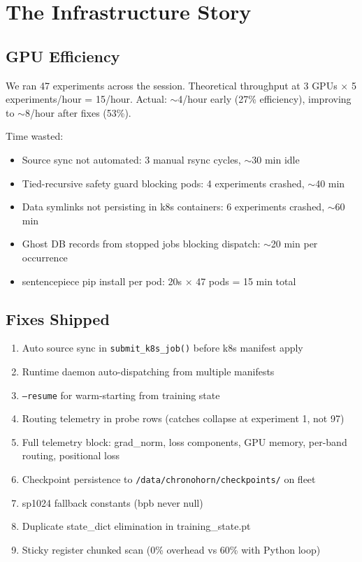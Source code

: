 \documentclass[11pt,a4paper]{report}
\begin{document}
\chapter{The Infrastructure Story}

\section{GPU Efficiency}

We ran 47 experiments across the session. Theoretical throughput at 3 GPUs $\times$ 5 experiments/hour = 15/hour. Actual: $\sim$4/hour early (27\% efficiency), improving to $\sim$8/hour after fixes (53\%).

Time wasted:
\begin{itemize}[nosep]
\item Source sync not automated: 3 manual rsync cycles, $\sim$30 min idle
\item Tied-recursive safety guard blocking pods: 4 experiments crashed, $\sim$40 min
\item Data symlinks not persisting in k8s containers: 6 experiments crashed, $\sim$60 min
\item Ghost DB records from stopped jobs blocking dispatch: $\sim$20 min per occurrence
\item sentencepiece pip install per pod: 20s $\times$ 47 pods = 15 min total
\end{itemize}

\section{Fixes Shipped}

\begin{enumerate}[nosep]
\item Auto source sync in \texttt{submit\_k8s\_job()} before k8s manifest apply
\item Runtime daemon auto-dispatching from multiple manifests
\item \texttt{--resume} for warm-starting from training state
\item Routing telemetry in probe rows (catches collapse at experiment 1, not 97)
\item Full telemetry block: grad\_norm, loss components, GPU memory, per-band routing, positional loss
\item Checkpoint persistence to \texttt{/data/chronohorn/checkpoints/} on fleet
\item sp1024 fallback constants (bpb never null)
\item Duplicate state\_dict elimination in training\_state.pt
\item Sticky register chunked scan (0\% overhead vs 60\% with Python loop)
\end{enumerate}
\end{document}
